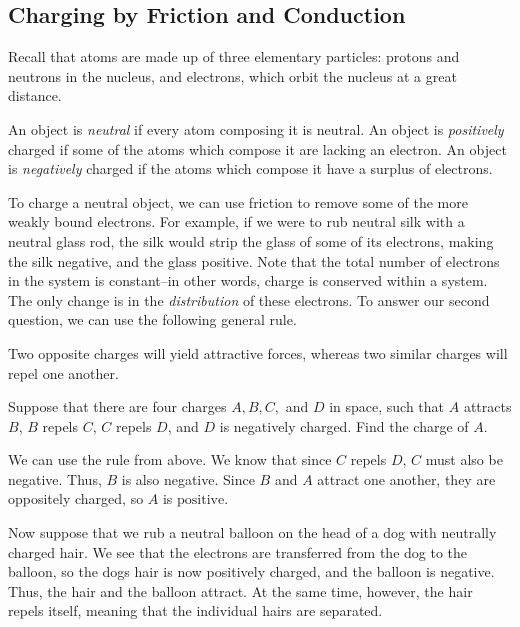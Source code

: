 \documentclass[11pt]{article}
\begin{document}
\subsection{Charging by Friction and Conduction}
Recall that atoms are made up of three elementary particles: protons and neutrons in the nucleus, and electrons, which orbit the nucleus at a great distance.
\begin{defn}
	An object is \textit{neutral} if every atom composing it is neutral. An object is \textit{positively} charged if some of the atoms which compose it are lacking an electron. An object is \textit{negatively} charged if the atoms which compose it have a surplus of electrons.
\end{defn}
To charge a neutral object, we can use friction to remove some of the more weakly bound electrons. For example, if we were to rub neutral silk with a neutral glass rod, the silk would strip the glass of some of its electrons, making the silk negative, and the glass positive. Note that the total number of electrons in the system is constant--in other words, charge is conserved within a system. The only change is in the \textit{distribution} of these electrons. To answer our second question, we can use the following general rule.
\begin{law}
	Two opposite charges will yield attractive forces, whereas two similar charges will repel one another.	
\end{law}
\begin{example}
	Suppose that there are four charges $A, B, C,$ and $D$ in space, such that $A$ attracts $B$, $B$ repels $C$, $C$ repels $D$, and $D$ is negatively charged. Find the charge of $A$.
\end{example}
\begin{solution}
	We can use the rule from above. We know that since $C$ repels $D$, $C$ must also be negative. Thus, $B$ is also negative. Since $B$ and $A$ attract one another, they are oppositely charged, so $A$ is $\boxed{\text{positive}}$.
\end{solution}

Now suppose that we rub a neutral balloon on the head of a dog with neutrally charged hair. We see that the electrons are transferred from the dog to the balloon, so the dogs hair is now positively charged, and the balloon is negative. Thus, the hair and the balloon attract. At the same time, however, the hair repels itself, meaning that the individual hairs are separated.
\end{document}
